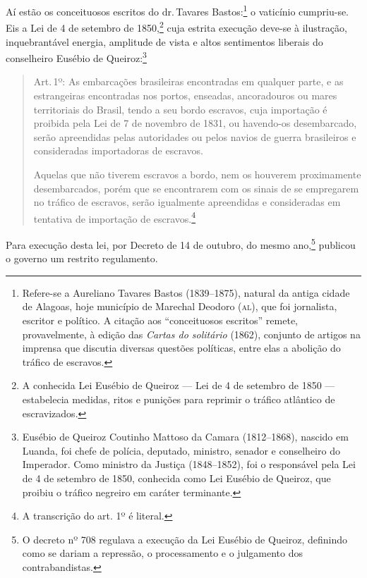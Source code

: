 Aí estão os conceituosos escritos do dr.\,Tavares Bastos:\footnote{
  Refere-se a Aureliano Tavares Bastos (1839--1875), natural da antiga
  cidade de Alagoas, hoje município de Marechal Deodoro (\textsc{al}), que foi
  jornalista, escritor e político. A citação aos ``conceituosos escritos''
  remete, provavelmente, à edição das \emph{Cartas do solitário} (1862),
  conjunto de artigos na imprensa que discutia diversas questões
  políticas, entre elas a abolição do tráfico de escravos.} o vaticínio
cumpriu-se. Eis a Lei de 4 de setembro de 1850,\footnote{A conhecida
  Lei Eusébio de Queiroz --- Lei de 4 de setembro de 1850 --- estabelecia
  medidas, ritos e punições para reprimir o tráfico atlântico de
  escravizados.} cuja estrita execução deve-se à ilustração,
inquebrantável energia, amplitude de vista e altos sentimentos liberais
do conselheiro Eusébio de Queiroz:\footnote{Eusébio de Queiroz \label{eusebio}
  Coutinho Mattoso da Camara (1812--1868), nascido em
  Luanda, foi chefe de polícia, deputado, ministro, senador e
  conselheiro do Imperador. Como ministro da Justiça (1848--1852), foi o
  responsável pela Lei de 4 de setembro de 1850, conhecida como Lei
  Eusébio de Queiroz, que proibiu o tráfico negreiro em caráter
  terminante.}

\begin{quote}
Art.\,1º: As embarcações brasileiras encontradas em qualquer parte, e as
estrangeiras encontradas nos portos, enseadas, ancoradouros ou mares
territoriais do Brasil, tendo a seu bordo escravos, cuja importação é
proibida pela Lei de 7 de novembro de 1831, ou havendo-os desembarcado,
serão apreendidas pelas autoridades ou pelos navios de guerra
brasileiros e consideradas importadoras de escravos.

Aquelas que não tiverem escravos a bordo, nem os houverem proximamente
desembarcados, porém que se encontrarem com os sinais de se empregarem
no tráfico de escravos, serão igualmente apreendidas e consideradas em
tentativa de importação de escravos.\footnote{A transcrição do art.
  1º é literal.}
\end{quote}  

Para execução desta lei, por Decreto de 14 de outubro, do mesmo
ano,\footnote{O decreto nº 708 regulava a execução da Lei Eusébio de
  Queiroz, definindo como se dariam a repressão, o processamento e o
  julgamento dos contrabandistas.} publicou o governo um restrito
regulamento.

